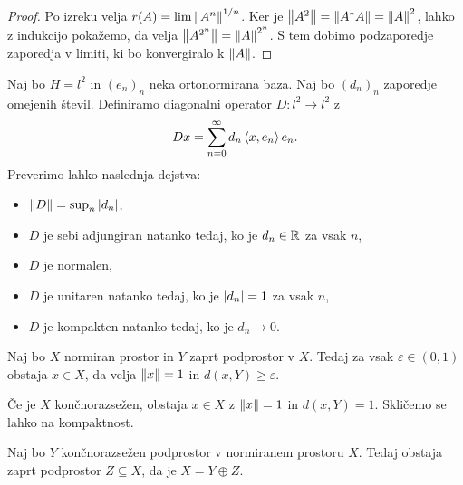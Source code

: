 \begin{proof}
  Po izreku velja $r(A) = \lim \left\lVert A^n\right\rVert^{1/n}$.
  Ker je $\left\lVert A^2\right\rVert = \left\lVert A^* A\right\rVert = \left\lVert A\right\rVert^2$, lahko z indukcijo pokažemo,
  da velja $\left\lVert A^{2^n}\right\rVert = \left\lVert A\right\rVert^{2^n}$.
  S tem dobimo podzaporedje zaporedja v limiti, ki bo konvergiralo k $\left\lVert A\right\rVert$.
\end{proof}



\begin{primer}
  Naj bo $H = l^2$ in $(e_n)_n$ neka ortonormirana baza.
  Naj bo $(d_n)_n$ zaporedje omejenih števil.
  Definiramo diagonalni operator $D: l^2 \to l^2$ z
  \[
	Dx = \sum_{n=0}^\infty d_n \left< x, e_n \right> e_n.
  \]
  Preverimo lahko naslednja dejstva:
  \begin{itemize}
  \item $\left\lVert D\right\rVert = \sup_n \left| d_n \right|$,
  \item $D$ je sebi adjungiran natanko tedaj, ko je $d_n \in \mathbb{R}$ za vsak $n$,
  \item $D$ je normalen,
  \item $D$ je unitaren natanko tedaj, ko je $\left| d_n \right| = 1$ za vsak $n$,
  \item $D$ je kompakten natanko tedaj, ko je $d_n \to 0$.
  \end{itemize}
\end{primer}

\begin{lema}
  Naj bo $X$ normiran prostor in $Y$ zaprt podprostor v $X$.
  Tedaj za vsak $\varepsilon \in (0,1)$ obstaja $x \in X$, da velja $\left\lVert x\right\rVert =
  1$ in $d(x,Y) \ge \varepsilon$.
\end{lema}


\begin{opomba}
  Če je $X$ končnorazsežen, obstaja $x \in X$ z $\left\lVert x\right\rVert = 1$ in $d(x,Y) = 1$.
  Skličemo se lahko na kompaktnost.
\end{opomba}

\begin{trditev}
  Naj bo $Y$ končnorazsežen podprostor v normiranem prostoru $X$.
  Tedaj obstaja zaprt podprostor $Z \subseteq X$, da je $X = Y \oplus Z$.
\end{trditev}


